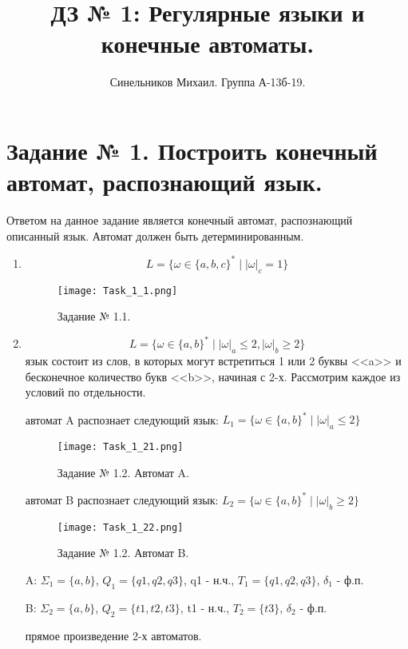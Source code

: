\documentclass[a4paper, 12pt]{article}
\title{ДЗ № 1: Регулярные языки и конечные автоматы.}
\author{Синельников Михаил. Группа А-13б-19.}
\date{}
\begin{document}
\maketitle

\newpage

\section{Задание № 1.  Построить конечный автомат, распознающий язык.}

Ответом на данное задание является конечный автомат, распознающий описанный язык. Автомат должен быть детерминированным.

\begin{enumerate}

\item$$ L = \{\omega \in \{a, b, c\}^* \mid  |\omega|_c = 1 \} $$
\begin{figure}[!h]
\centering
\texttt{[image: Task\_1\_1.png]}
\caption{Задание № 1.1.}
\end{figure}

\item$$ L = \{\omega \in \{a, b\}^* \mid |\omega|_a \leq 2,|\omega|_b \geq 2 \} $$
 язык состоит из слов, в которых могут встретиться 1 или 2 буквы <<a>> и бесконечное количество букв <<b>>, начиная с 2-х. Рассмотрим каждое из условий по отдельности.

 автомат A распознает следующий язык: $ L_1 = \{\omega \in \{a, b\}^* \mid |\omega|_a \leq 2 \} $
\begin{figure}[h!]
\centering
\texttt{[image: Task\_1\_21.png]}
\caption{Задание № 1.2. Автомат A.}
\end{figure}

 автомат B распознает следующий язык: $ L_2 = \{\omega \in \{a, b\}^* \mid |\omega|_b \geq 2 \} $
\begin{figure}[!h]
\centering
\texttt{[image: Task\_1\_22.png]}
\caption{Задание № 1.2. Автомат B.}
\end{figure}

 A: $ \Sigma_1 = \{a, b\}$, $ Q_1 = \{q1, q2, q3 \} $, q1 - н.ч., $ T_1 = \{q1, q2, q3 \} $, $ \delta_1 $ - ф.п.

 B: $ \Sigma_2 = \{a, b\}$, $ Q_2 = \{t1, t2, t3 \} $, t1 - н.ч., $ T_2 = \{t3 \} $, $ \delta_2 $ - ф.п.

 прямое произведение 2-х автоматов.


\end{enumerate}
\end{document}
